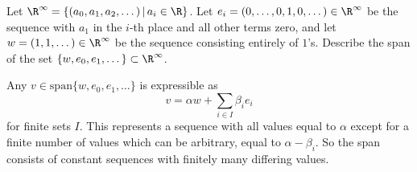 \begin{problem}
  Let $\R^\infty=\{(a_0, a_1, a_2, \dots )\,|\, a_i \in \R\}$. Let $e_i = (0, \dots, 0, 1, 0, \dots) \in \R^\infty$ be the sequence with $a_1$ in the $i$-th place and all other terms zero, and let $w = (1,1,\dots) \in \R^\infty$ be the sequence consisting entirely of $1$'s. Describe the span of the set $\{w, e_0, e_1, \dots \} \subset \R^\infty$.
\end{problem}

Any $v\in \textrm{span}\{w, e_0, e_1, \dots \}$ is expressible as
\[
  v = \alpha w + \sum_{i\in I}\beta_i e_i
\]
for finite sets $I$. This represents a sequence with all values equal to $\alpha$ except for a finite number of values which can be arbitrary, equal to $\alpha-\beta_i$. So the span consists of constant sequences with finitely many differing values.